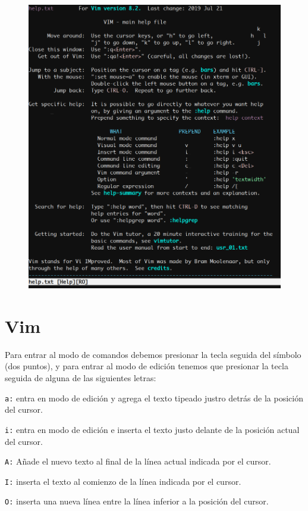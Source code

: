 \begin{figure}[ht!]
	\centering
	\includegraphics[width=0.8\paperwidth]{./img/VimHelp}
\end{figure}

\section{Vim}
Para entrar al modo de comandos debemos presionar
la tecla  seguida del símbolo \keys{:}
(dos puntos), y para entrar al modo de edición tenemos que
presionar la tecla  seguida de alguna de las
siguientes letras:

\texttt{a:} entra en modo de edición y agrega el texto
tipeado justro detrás de la posición del cursor.

\texttt{i:} entra en modo de edición e inserta el texto
justo delante de la posición actual del cursor.

\texttt{A:} Añade el nuevo texto al final de la línea actual
indicada por el cursor.

\texttt{I:} inserta el texto al comienzo de la línea indicada
por el cursor.

\texttt{O:} inserta una nueva línea entre la línea inferior a la
posición del cursor.

